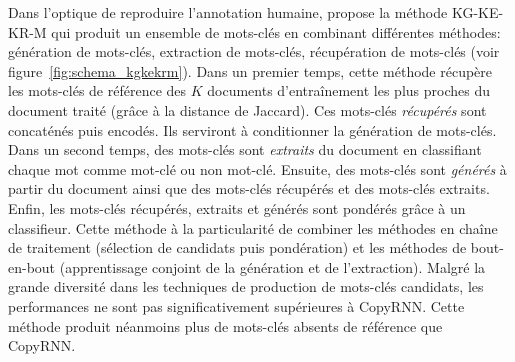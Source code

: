 Dans l'optique de reproduire l'annotation humaine, \citet{chen_integrated_2019} propose la méthode KG-KE-KR-M qui produit un ensemble de mots-clés en combinant différentes méthodes: génération de mots-clés, extraction de mots-clés, récupération de mots-clés (voir figure~\ref{fig:schema_kgkekrm}).
%
Dans un premier temps, cette méthode récupère les mots-clés de référence des $K$ documents d'entraînement les plus proches du document traité (grâce à la distance de Jaccard).
Ces mots-clés \emph{récupérés} sont concaténés puis encodés. Ils serviront à conditionner la génération de mots-clés.
Dans un second temps, des mots-clés sont \emph{extraits} du document en classifiant chaque mot comme mot-clé ou non mot-clé.
Ensuite, des mots-clés sont \emph{générés} à partir du document ainsi que des mots-clés récupérés et des mots-clés extraits.
Enfin, les mots-clés récupérés, extraits et générés sont pondérés grâce à un classifieur.
Cette méthode à la particularité de combiner les méthodes en chaîne de traitement (sélection de candidats puis pondération) et les méthodes de bout-en-bout (apprentissage conjoint de la génération et de l'extraction).
Malgré la grande diversité dans les techniques de production de mots-clés candidats, les performances ne sont pas significativement supérieures à CopyRNN. Cette méthode produit néanmoins plus de mots-clés absents de référence que CopyRNN.

